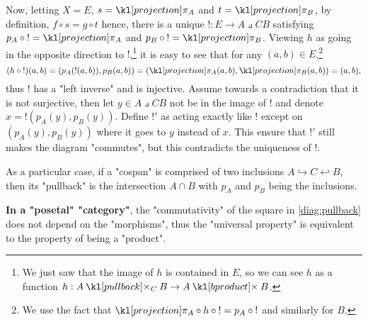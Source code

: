 \documentclass[main.tex]{subfiles}
\begin{document}
\begin{exmp}[$\catSet$]
    Now, letting $X= E$, $s = \projection_A$ and $t = \projection_B$, by definition, $f \circ s = g \circ t$ hence, there is a unique $!: E \rightarrow A\pullback{C} B$ satisfying $p_A \circ {!} = \projection_A$ and $p_B \circ {!} = \projection_B$. Viewing $h$ as going in the opposite direction to $!$,\footnote{We just saw that the image of $h$ is contained in $E$, so we can see $h$ as a function $h: A \pullback{C} B \rightarrow A\product B$.} it is easy to see that for any $(a,b) \in E$,\footnote{We use the fact that $\projection_A \circ h \circ {!} = p_A \circ {!}$ and similarly for $B$.} \[(h\circ {!})(a,b) = (p_A(!(a,b)), p_B(a,b)) = (\projection_A(a,b), \projection_B(a,b)) = (a,b),\] thus $!$ has a "left inverse" and is injective. Assume towards a contradiction that it is not surjective, then let $y \in A\pullback{C} B$ not be in the image of $!$ and denote $x = !(p_A(y), p_B(y))$. Define $!'$ as acting exactly like $!$ except on $(p_A(y),p_B(y))$ where it goes to $y$ instead of $x$. This ensure that $!'$ still makes the diagram "commutes", but this contradicts the uniqueness of $!$.

    As a particular case, if a "cospan" is comprised of two inclusions $A \hookrightarrow C \hookleftarrow B$, then its "pullback" is the intersection $A \cap B$ with $p_A$ and $p_B$ being the inclusions. %
\end{exmp}
\begin{exmps}
    \textbf{In a "posetal" "category"}, the "commutativity" of the square in \eqref{diag:pullback} does not depend on the "morphisms", thus the "universal property" is equivalent to the property of being a "product". %
\end{exmps}
\end{document}
